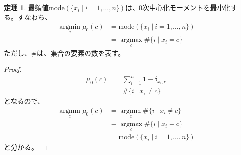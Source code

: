 \documentclass{jsarticle}
\theoremstyle{definition}
\newtheorem*{theorem}{定理}
\newcommand{\argmin}{\mathop{\mathrm{argmin}}\limits}
\newcommand{\argmax}{\mathop{\mathrm{argmax}}\limits}
\begin{document}
\begin{theorem}
  最頻値$\mathrm{mode}(\{x_i \mid i=1,\dots,n\})$は、0次中心化モーメントを最小化する。すなわち、
  \begin{align*}
    \argmin_c\mu_0(c)&=\mathrm{mode}(\{x_i \mid i=1,\dots,n\})\\
    &=\argmax_c\#\{i \mid x_i=c\}
  \end{align*}
  ただし、$\#$は、集合の要素の数を表す。
\end{theorem}

\begin{proof}
  \begin{align*}
    \mu_0(c)&=\sum_{i=1}^n1-\delta_{x_i,c}\\
    &=\#\{i \mid x_i \ne c\}
  \end{align*}
  となるので、
  \begin{align*}
    \argmin_c\mu_0(c)&=\argmin_c\#\{i \mid x_i \ne c\}\\
    &=\argmax_c\#\{i \mid x_i=c\}\\
    &=\mathrm{mode}(\{x_i \mid i=1,\dots,n\})
  \end{align*}
  と分かる。
\end{proof}
\end{document}
